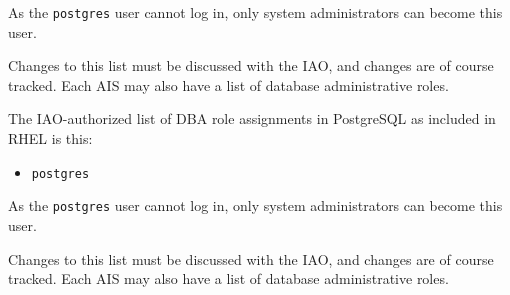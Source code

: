 As the \verb!postgres! user cannot log in, only system administrators can
become this user.

Changes to this list must be discussed with the IAO, and changes are of
course tracked. Each AIS may also have a list of database administrative
roles.

%
The IAO-authorized list of DBA role assignments in PostgreSQL as included
in RHEL is this:

\begin{itemize}
\item \verb!postgres!
\end{itemize}

As the \verb!postgres! user cannot log in, only system administrators can
become this user.

Changes to this list must be discussed with the IAO, and changes are of
course tracked. Each AIS may also have a list of database administrative
roles.

